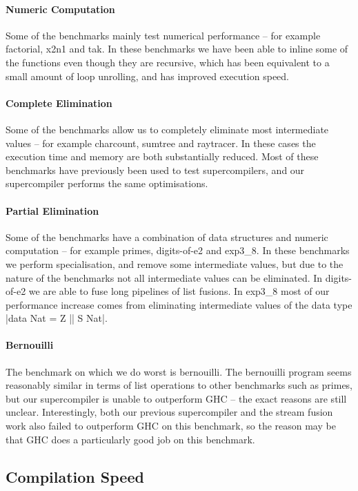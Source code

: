 \documentclass[draft]{sigplanconf}
\begin{document}
\paragraph{Numeric Computation} Some of the benchmarks mainly test numerical performance -- for example factorial, x2n1 and tak. In these benchmarks we have been able to inline some of the functions even though they are recursive, which has been equivalent to a small amount of loop unrolling, and has improved execution speed.

\paragraph{Complete Elimination} Some of the benchmarks allow us to completely eliminate most intermediate values -- for example charcount, sumtree and raytracer. In these cases the execution time and memory are both substantially reduced. Most of these benchmarks have previously been used to test supercompilers, and our supercompiler performs the same optimisations.

\paragraph{Partial Elimination} Some of the benchmarks have a combination of data structures and numeric computation -- for example primes, digits-of-e2 and exp3\_8. In these benchmarks we perform specialisation, and remove some intermediate values, but due to the nature of the benchmarks not all intermediate values can be eliminated. In digits-of-e2 we are able to fuse long pipelines of list fusions. In exp3\_8 most of our performance increase comes from eliminating intermediate values of the data type |data Nat = Z || S Nat|.

\paragraph{Bernouilli} The benchmark on which we do worst is bernouilli. The bernouilli program seems reasonably similar in terms of list operations to other benchmarks such as primes, but our supercompiler is unable to outperform GHC -- the exact reasons are still unclear. Interestingly, both our previous supercompiler and the stream fusion work also failed to outperform GHC on this benchmark, so the reason may be that GHC does a particularly good job on this benchmark.

\subsection{Compilation Speed}
\label{sec:benchmarks_compile}
\end{document}
